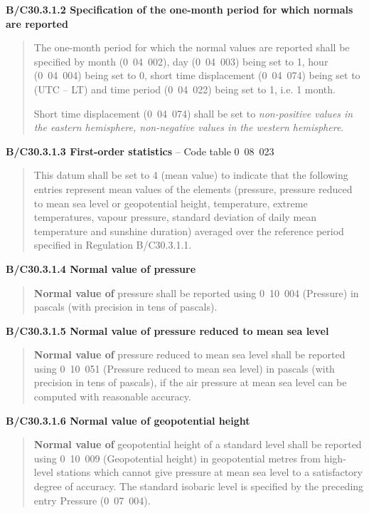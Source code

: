 \textbf{B/C30.3.1.2 Specification of the one-month period for which normals are reported}

\begin{quote}
The one-month period for which the normal values are reported shall be specified by month (0~04~002), day (0~04~003) being set to 1, hour (0~04~004) being set to 0, short time displacement (0~04~074) being set to (UTC -- LT) and time period (0~04~022) being set to 1, i.e. 1 month.

Short time displacement (0~04~074) shall be set to \emph{non-positive values in the eastern hemisphere, non-negative values in the western hemisphere}.
\end{quote}

\textbf{B/C30.3.1.3 First-order statistics} -- Code table 0~08~023

\begin{quote}
This datum shall be set to 4 (mean value) to indicate that the following entries represent mean values of the elements (pressure, pressure reduced to mean sea level or geopotential height, temperature, extreme temperatures, vapour pressure, standard deviation of daily mean temperature and sunshine duration) averaged over the reference period specified in Regulation B/C30.3.1.1.
\end{quote}

\textbf{B/C30.3.1.4 Normal value of pressure}

\begin{quote}
\textbf{Normal value of} pressure shall be reported using 0~10~004 (Pressure) in pascals (with precision in tens of pascals).
\end{quote}

\textbf{B/C30.3.1.5 Normal value of pressure reduced to mean sea level}

\begin{quote}
\textbf{Normal value of} pressure reduced to mean sea level shall be reported using 0~10~051 (Pressure reduced to mean sea level) in pascals (with precision in tens of pascals), if the air pressure at mean sea level can be computed with reasonable accuracy.
\end{quote}

\textbf{B/C30.3.1.6 Normal value of geopotential height}

\begin{quote}
\textbf{Normal value of} geopotential height of a standard level shall be reported using 0~10~009 (Geopotential height) in geopotential metres from high-level stations which cannot give pressure at mean sea level to a satisfactory degree of accuracy. The standard isobaric level is specified by the preceding entry Pressure (0~07~004).
\end{quote}

